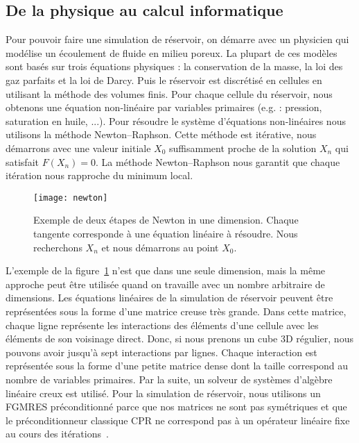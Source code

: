 \subsection{De la physique au calcul informatique}
Pour pouvoir faire une simulation de réservoir, on démarre avec un physicien qui modélise un écoulement de fluide en milieu poreux.
%
La plupart de ces modèles sont basés sur trois équations physiques : la conservation de la masse, la loi des gaz parfaits et la loi de Darcy.
%
Puis le réservoir est discrétisé en cellules en utilisant la méthode des volumes finis.
%
Pour chaque cellule du réservoir, nous obtenons une équation non-linéaire par variables primaires (e.g. : pression, saturation en huile, ...).
%
Pour résoudre le système d'équations non-linéaires nous utilisons la méthode Newton–Raphson.
%
Cette méthode est itérative, nous démarrons avec une valeur initiale $X_0$ suffisamment proche de la solution $X_n$ qui satisfait $F(X_n) = 0$.
%
La méthode Newton–Raphson nous garantit que chaque itération nous rapproche du minimum local.

\begin{figure}[!ht]
  \centering
  \texttt{[image: newton]}
  \caption{Exemple de deux étapes de Newton in une dimension.
    Chaque tangente corresponde à une équation linéaire à résoudre.
    Nous recherchons $X_n$ et nous démarrons au point $X_0$.}
\label{fig:newton}
\end{figure}

L'exemple de la figure~\ref{fig:newton} n'est que dans une seule dimension, mais la même approche peut être utilisée quand on travaille avec un nombre arbitraire de dimensions.
%
Les équations linéaires de la simulation de réservoir peuvent être représentées sous la forme d'une matrice creuse très grande.
%
Dans cette matrice, chaque ligne représente les interactions des éléments d'une cellule avec les éléments de son voisinage direct.
%
Donc, si nous prenons un cube 3D régulier, nous pouvons avoir jusqu'à sept interactions par lignes.
%
Chaque interaction est représentée sous la forme d'une petite matrice dense dont la taille correspond au nombre de variables primaires.
%
Par la suite, un solveur de systèmes d'algèbre linéaire creux est utilisé.
%
Pour la simulation de réservoir, nous utilisons un FGMRES préconditionné parce que nos matrices ne sont pas symétriques et que le préconditionneur classique CPR ne correspond pas à un opérateur linéaire fixe au cours des itérations~\cite{cao2005parallel}.

